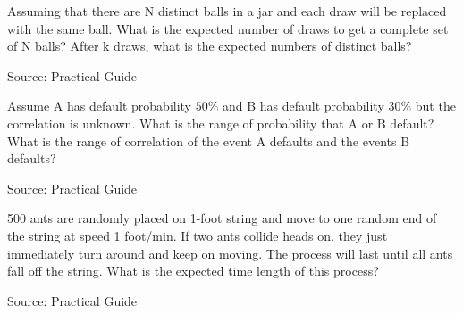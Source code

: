 \begin{exe}
Assuming that there are N distinct balls in a jar and each draw will be replaced with the same ball. What is the expected number of draws to get a complete set of N balls? After k draws, what is the expected numbers of distinct balls?

\end{exe}
Source: Practical Guide
\begin{teacher}
\begin{sol}
\end{sol}
\end{teacher}

\begin{exe}
Assume A has default probability $50\%$ and B has default probability $30\%$ but the correlation is unknown. What is the range of probability that A or B default? What is the range of correlation of the event A defaults and the events B defaults?
\end{exe}
Source: Practical Guide
\begin{teacher}
\begin{sol}
\end{sol}
\end{teacher}




\begin{exe}
500 ants are randomly placed on 1-foot string and move to one random end of the string at speed 1 foot/min. If two ants collide heads on, they just immediately turn around and keep on moving. The process will last until all ants fall off the string. What is the expected time length of this process?
\end{exe}
Source: Practical Guide
\begin{teacher}
\begin{sol}
\end{sol}
\end{teacher}








